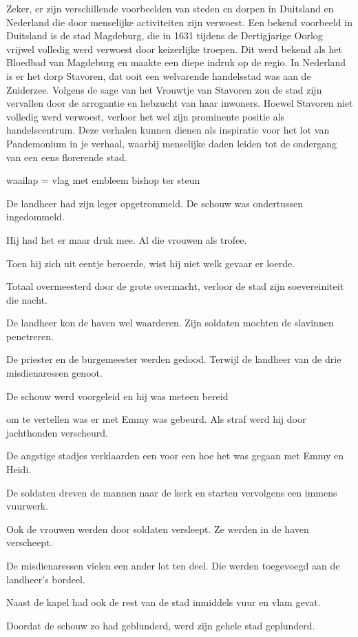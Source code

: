 Zeker, er zijn verschillende voorbeelden van steden en dorpen in Duitsland en Nederland die door menselijke activiteiten zijn verwoest. Een bekend voorbeeld in Duitsland is de stad Magdeburg, die in 1631 tijdens de Dertigjarige Oorlog vrijwel volledig werd verwoest door keizerlijke troepen. Dit werd bekend als het Bloedbad van Magdeburg en maakte een diepe indruk op de regio.
In Nederland is er het dorp Stavoren, dat ooit een welvarende handelsstad was aan de Zuiderzee. Volgens de sage van het Vrouwtje van Stavoren zou de stad zijn vervallen door de arrogantie en hebzucht van haar inwoners. Hoewel Stavoren niet volledig werd verwoest, verloor het wel zijn prominente positie als handelscentrum.
Deze verhalen kunnen dienen als inspiratie voor het lot van Pandemonium in je verhaal, waarbij menselijke daden leiden tot de ondergang van een eens florerende stad.

waailap = vlag met embleem bishop ter steun

De landheer had zijn leger opgetrommeld.
De schouw was ondertussen ingedommeld.

Hij had het er maar druk mee.
Al die vrouwen als trofee.

Toen hij zich uit eentje beroerde,
wist hij niet welk gevaar er loerde.

Totaal overmeesterd door de grote overmacht,
verloor de stad zijn soevereiniteit die nacht.

De landheer kon de haven wel waarderen.
Zijn soldaten mochten de slavinnen penetreren.

De priester en de burgemeester werden gedood.
Terwijl de landheer van de drie misdienaressen genoot.

De schouw werd voorgeleid
en hij was meteen bereid

om te vertellen was er met Emmy was gebeurd.
Als straf werd hij door jachthonden verscheurd.

De angstige stadjes verklaarden een voor een
hoe het was gegaan met Emmy en Heidi.

De soldaten dreven de mannen naar de kerk
en starten vervolgens een immens vuurwerk.

Ook de vrouwen werden door soldaten versleept.
Ze werden in de haven verscheept.

De misdienaressen vielen een ander lot ten deel.
Die werden toegevoegd aan de landheer’s bordeel.

Naast de kapel had ook de rest van de stad
inmiddels vuur en vlam gevat.

Doordat de schouw zo had geblunderd,
werd zijn gehele stad geplunderd.

